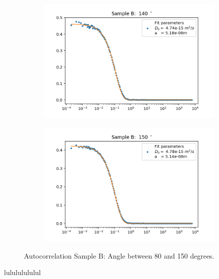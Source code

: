 \documentclass[]{article}
\begin{document}
\begin{figure}[!h]
\medskip
\begin{subfigure}{0.48\textwidth}
\includegraphics[width=\linewidth]{Plots/B/140.png}
\end{subfigure}
\begin{subfigure}[c]{0.48\linewidth}
\includegraphics[width=\linewidth]{Plots/B/150.png}
\end{subfigure}

\caption{Autocorrelation Sample B: Angle between 80 and 150 degrees.}
\end{figure}


\newpage
\begin{thebibliography}{}

 lulululululul

\end{thebibliography}
\end{document}

